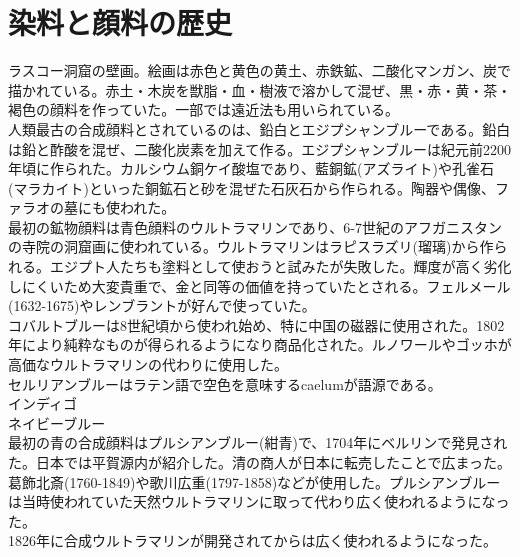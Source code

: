 \documentclass{jsarticle}
\begin{document}
	\section{染料と顔料の歴史}
		ラスコー洞窟の壁画。絵画は赤色と黄色の黄土、赤鉄鉱、二酸化マンガン、炭で描かれている。赤土・木炭を獣脂・血・樹液で溶かして混ぜ、黒・赤・黄・茶・褐色の顔料を作っていた。一部では遠近法も用いられている。\\
		人類最古の合成顔料とされているのは、鉛白とエジプシャンブルーである。鉛白は鉛と酢酸を混ぜ、二酸化炭素を加えて作る。エジプシャンブルーは紀元前2200年頃に作られた。カルシウム銅ケイ酸塩であり、藍銅鉱(アズライト)や孔雀石(マラカイト)といった銅鉱石と砂を混ぜた石灰石から作られる。陶器や偶像、ファラオの墓にも使われた。\\
		最初の鉱物顔料は青色顔料のウルトラマリンであり、6-7世紀のアフガニスタンの寺院の洞窟画に使われている。ウルトラマリンはラピスラズリ(瑠璃)から作られる。エジプト人たちも塗料として使おうと試みたが失敗した。輝度が高く劣化しにくいため大変貴重で、金と同等の価値を持っていたとされる。フェルメール(1632-1675)やレンブラントが好んで使っていた。\\
		コバルトブルーは8世紀頃から使われ始め、特に中国の磁器に使用された。1802年により純粋なものが得られるようになり商品化された。ルノワールやゴッホが高価なウルトラマリンの代わりに使用した。\\
		セルリアンブルーはラテン語で空色を意味するcaelumが語源である。\\
		インディゴ\\
		ネイビーブルー\\
		最初の青の合成顔料はプルシアンブルー(紺青)で、1704年にベルリンで発見された。日本では平賀源内が紹介した。清の商人が日本に転売したことで広まった。葛飾北斎(1760-1849)や歌川広重(1797-1858)などが使用した。プルシアンブルーは当時使われていた天然ウルトラマリンに取って代わり広く使われるようになった。\\
		1826年に合成ウルトラマリンが開発されてからは広く使われるようになった。\\
\end{document}

